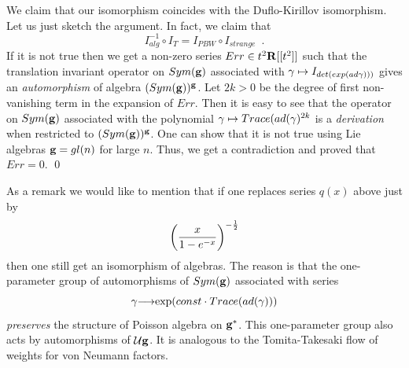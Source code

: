                          We claim that our isomorphism 
                          coincides with the 
                         Duflo-Kirillov 
                          isomorphism.
                      Let us just sketch the argument. 
                          In fact, we claim that
                          $$I_{alg}^{-1}\circ I_T=I_{PBW}\circ I_{strange}
                          \,\,\,.$$
                       If it is not true then we get a non-zero
                        series $Err\in t^2{\bf R}[[t^2]]$ such that
                         the translation invariant operator on $Sym({\bf g})$ 
                         associated with
                          ${\gamma}\mapsto I_{det(exp(ad{\gamma})))}$ gives an
                          {\it automorphism} of algebra $(Sym({\bf g}))^{\bf g}$.
                           Let $2k>0$ be the degree of first non-vanishing
                            term in the expansion of $Err$.
                        Then it is easy to see that
                         the operator on $Sym({\bf g})$ 
                         associated with the polynomial ${\gamma}\mapsto
                          Trace(ad({\gamma})^
                         {2k}$ is a {\it derivation} when restricted
                          to $(Sym({\bf g}))^{\bf g}$.
                       One can show that it is not true
                            using Lie algebras  ${\bf g}=gl(n)$ for large $n$.
                            Thus, we get a contradiction and proved
                             that $Err=0$.
                           \qed
                           
                           
                            As a remark we would like to mention that
                             if one replaces series $q(x)$
                              above just by
                         $$\left({x\over 1-e^{-x}}\right)^{-{1\over 2}}
                         $$ 
                         then one still get an isomorphism of algebras.
                          The reason is that the one-parameter group
                          of automorphisms of $Sym({\bf g})$ associated with series
                          $${\gamma}{\longrightarrow} {\rm exp} (const \cdot Trace(ad({\gamma})))$$
                           {\it preserves} the  structure 
                            of Poisson algebra on ${\bf g}^*$.
                            This  one-parameter group also acts by 
                            automorphisms of ${\cal U}{\bf g}$. It is analogous to 
                            the  Tomita-Takesaki flow of weights for
                          von Neumann  factors.
                                
